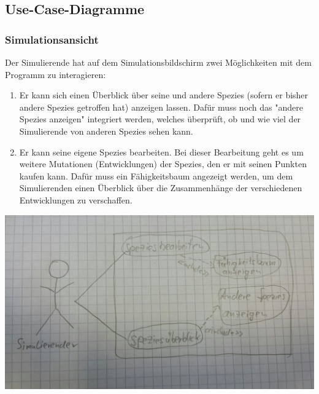 \documentclass[a4paper, 10pt]{article}
\begin{document}
\subsection{Use-Case-Diagramme}
\subsubsection{Simulationsansicht}
\begin{minipage}{100mm} 
Der Simulierende hat auf dem Simulationsbildschirm zwei Möglichkeiten mit dem Programm zu interagieren:
\begin{enumerate}
\item Er kann sich einen Überblick über seine und andere Spezies (sofern er bisher andere Spezies getroffen hat) anzeigen lassen.
Dafür muss noch das "andere Spezies anzeigen" integriert werden, welches überprüft, ob und wie viel der Simulierende von anderen Spezies sehen kann.
\item Er kann seine eigene Spezies bearbeiten. Bei dieser Bearbeitung geht es um weitere Mutationen (Entwicklungen) der Spezies, den er mit seinen Punkten kaufen kann. Dafür muss ein Fähigkeitsbaum angezeigt werden, um dem Simulierenden einen Überblick über die Zusammenhänge der verschiedenen Entwicklungen zu verschaffen.
\end{enumerate}
\includegraphics[scale=0.26]{Bilder/UC_Simulation.jpg}
\end{minipage}
\newpage
\end{document}
